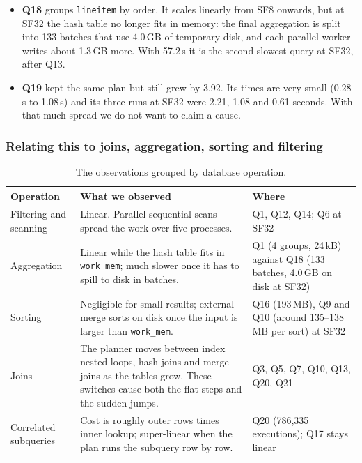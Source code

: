 \documentclass[11pt,a4paper]{article}
\newcommand{\file}[1]{\texttt{#1}}
\begin{document}
\begin{itemize}
to be in the cache.
\item \textbf{Q18} groups \file{lineitem} by order. It scales linearly from
SF8 onwards, but at SF32 the hash table no longer fits in memory: the final
aggregation is split into 133 batches that use 4.0\,GB of temporary disk, and
each parallel worker writes about 1.3\,GB more. With 57.2\,s it is the second
slowest query at SF32, after Q13.
\item \textbf{Q19} kept the same plan but still grew by 3.92. Its times are
very small (0.28\,s to 1.08\,s) and its three runs at SF32 were 2.21, 1.08
and 0.61 seconds. With that much spread we do not want to claim a cause.
\end{itemize}

\subsubsection*{Relating this to joins, aggregation, sorting and filtering}

\begin{table}[H]
\centering
\small
\begin{tabularx}{\textwidth}{@{}p{2.6cm}XX@{}}
\toprule
Operation & What we observed & Where \\
\midrule
Filtering and scanning & Linear. Parallel sequential scans spread the work over five processes. & Q1, Q12, Q14; Q6 at SF32 \\
Aggregation & Linear while the hash table fits in \file{work\_mem}; much slower once it has to spill to disk in batches. & Q1 (4 groups, 24\,kB) against Q18 (133 batches, 4.0\,GB on disk at SF32) \\
Sorting & Negligible for small results; external merge sorts on disk once the input is larger than \file{work\_mem}. & Q16 (193\,MB), Q9 and Q10 (around 135--138\,MB per sort) at SF32 \\
Joins & The planner moves between index nested loops, hash joins and merge joins as the tables grow. These switches cause both the flat steps and the sudden jumps. & Q3, Q5, Q7, Q10, Q13, Q20, Q21 \\
Correlated subqueries & Cost is roughly outer rows times inner lookup; super-linear when the plan runs the subquery row by row. & Q20 (786{,}335 executions); Q17 stays linear \\
\bottomrule
\end{tabularx}
\caption{The observations grouped by database operation.}
\label{tab:operations}
\end{table}
\end{document}
